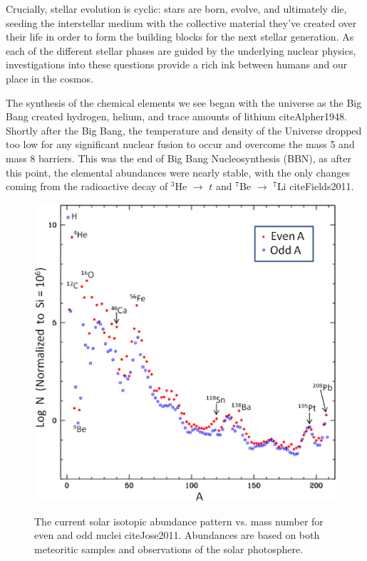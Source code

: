 \noindent Crucially, stellar evolution is cyclic: stars are born, evolve, and ultimately die, seeding the interstellar medium with the collective material they've created over their life in order to form the building blocks for the next stellar generation. As each of the different stellar phases are guided by the underlying nuclear physics, investigations into these questions provide a rich ink between humans and our place in the cosmos. 

The synthesis of the chemical elements we see began with the universe as the Big Bang created hydrogen, helium, and trace amounts of lithium cite{Alpher1948}. Shortly after the Big Bang, the temperature and density of the Universe dropped too low for any significant nuclear fusion to occur and overcome the mass 5 and mass 8 barriers. This was the end of Big Bang Nucleosynthesis (BBN), as after this point, the elemental abundances were nearly stable, with the only changes coming from the radioactive decay of $^{3}$He $\rightarrow$ $t$ and $^{7}$Be $\rightarrow$ $^{7}$Li cite{Fields2011}.

\begin{figure}
\includegraphics[width=\linewidth]{figures/abundances.jpg}
\label{fig: abundances}
\caption{The current solar isotopic abundance pattern vs. mass number for even and odd nuclei cite{Jose2011}. Abundances are based on both meteoritic samples and observations of the solar photosphere. }
\end{figure}

